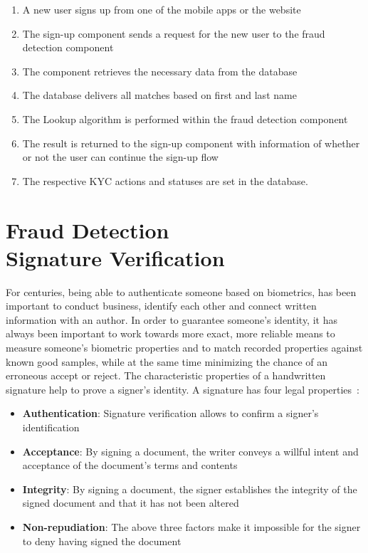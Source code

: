 \documentclass[a4paper, oneside]{csthesis}
\begin{document}
\begin{enumerate}
\item A new user signs up from one of the mobile apps or the website
\item The sign-up component sends a request for the new user to the fraud detection component
\item The component retrieves the necessary data from the database
\item The database delivers all matches based on first and last name
\item The Lookup algorithm is performed within the fraud detection component
\item The result is returned to the sign-up component with information of whether or not the user can continue the sign-up flow
\item The respective KYC actions and statuses are set in the database.
\end{enumerate}












\chapter{Fraud Detection \\Signature Verification}
\label{chp:signature-verification}

For centuries, being able to authenticate someone based on biometrics, has been important to conduct business, identify each other and connect written information with an author. In order to guarantee someone's identity, it has always been important to work towards more exact, more reliable means to measure someone's biometric properties and to match recorded properties against known good samples, while at the same time minimizing the chance of an erroneous accept or reject. The characteristic properties of a handwritten signature help to prove a signer's identity. A signature has four legal properties~\cite{Hanmandlu05}:

\begin{itemize}
\item \textbf{Authentication}: Signature verification allows to confirm a signer's identification
\item \textbf{Acceptance}: By signing a document, the writer conveys a willful intent and acceptance of the document's terms and contents
\item \textbf{Integrity}: By signing a document, the signer establishes the integrity of the signed document and that it has not been altered
\item \textbf{Non-repudiation}: The above three factors make it impossible for the signer to deny having signed the document
\end{itemize}
\end{document}
